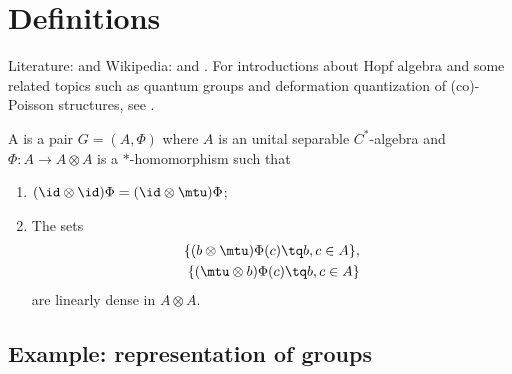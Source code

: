 
\section{Definitions}

Literature: \cite{CompactQuantumGpWoro,Ritter,Koelink} and Wikipedia:  and . For introductions about Hopf algebra and some related topics such as quantum groups and deformation quantization of (co)-Poisson structures, see \cite{Tjin}.

\begin{definition}
    A  is a pair $G=(A,\Phi)$ where $A$ is an unital separable $C^*$-algebra and $\Phi\colon A\to A\otimes A$ is a $*$-homomorphism such that
    \begin{enumerate}
        \item
            $(\id\otimes\id)\Phi=(\id\otimes\mtu)\Phi$;
        \item
            The sets
            \begin{equation}
                \begin{aligned}[]
                    \{ (b\otimes\mtu)\Phi(c)\tq b,c\in A \},\\
                    \{ (\mtu\otimes b)\Phi(c)\tq b,c\in A \}
                \end{aligned}
            \end{equation}
            are linearly dense in $A\otimes A$.
    \end{enumerate}
\end{definition}

\subsection{Example: representation of groups}

